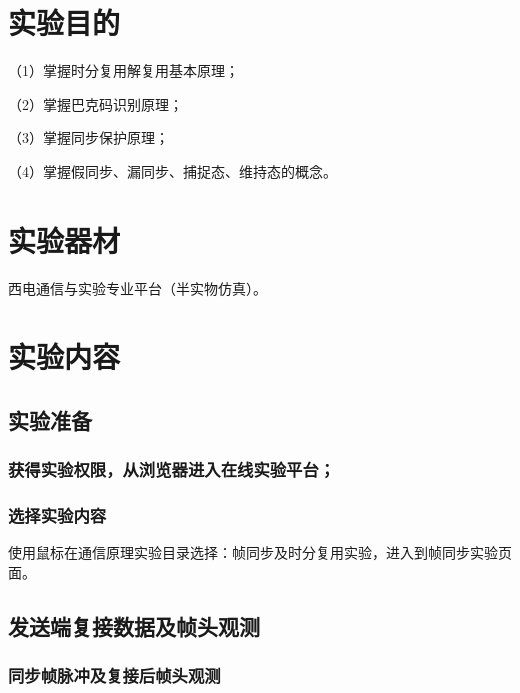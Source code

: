 \documentclass{xjtureport}
\begin{document}
\begin{titlepage}
	
\end{titlepage}







\section{实验目的}
（1）掌握时分复用解复用基本原理；

（2）掌握巴克码识别原理；

（3）掌握同步保护原理；

（4）掌握假同步、漏同步、捕捉态、维持态的概念。

\section{实验器材}

西电通信与实验专业平台（半实物仿真）。

\section{实验内容}

\subsection{实验准备}

\subsubsection{获得实验权限，从浏览器进入在线实验平台；}

\subsubsection{\textbf{选择实验内容}}

使用鼠标在通信原理实验目录选择：帧同步及时分复用实验，进入到帧同步实验页面。

\subsection{发送端复接数据及帧头观测}

\subsubsection{同步帧脉冲及复接后帧头观测}
\end{document}
